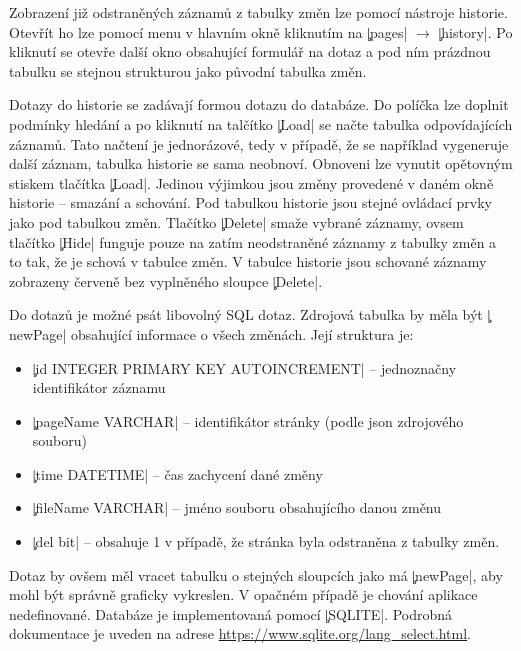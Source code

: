Zobrazení již odstraněných záznamů z tabulky změn lze pomocí nástroje historie.
Otevřít ho lze pomocí menu v hlavním okně kliknutím na \c|pages| $\rightarrow$ \c|history|.
Po kliknutí se otevře další okno obsahující formulář na dotaz a pod ním prázdnou tabulku se stejnou strukturou jako původní tabulka změn.

Dotazy do historie se zadávají formou dotazu do databáze. 
Do políčka lze doplnit podmínky hledání a po kliknutí na talčítko \c|Load| se načte tabulka odpovídajících záznamů. 
Tato načtení je jednorázové, tedy v případě, že se například vygeneruje další záznam, tabulka historie se sama neobnoví.
Obnoveni lze vynutit opětovným stiskem tlačítka \c|Load|.
Jedinou výjimkou jsou změny provedené v daném okně historie -- smazání a schování.
Pod tabulkou historie jsou stejné ovládací prvky jako pod tabulkou změn.
Tlačítko \c|Delete| smaže vybrané záznamy, ovsem tlačítko \c|Hide| funguje pouze na zatím neodstraněné záznamy z tabulky změn a to tak, že je schová  v tabulce změn.
V tabulce historie jsou schované záznamy zobrazeny červeně bez vyplněného sloupce \c|Delete|.

Do dotazů je možné psát libovolný SQL dotaz.
Zdrojová tabulka by měla být \c|newPage| obsahující informace o všech změnách. Její struktura je:
\begin{itemize}
	\item \c|id INTEGER PRIMARY KEY AUTOINCREMENT| -- jednoznačny identifikátor záznamu
	\item \c|pageName VARCHAR| -- identifikátor stránky (podle json zdrojového souboru)
	\item \c|time DATETIME| -- čas zachycení dané změny
	\item \c|fileName VARCHAR| -- jméno souboru obsahujícího danou změnu
	\item \c|del bit| -- obsahuje 1 v případě, že stránka byla odstraněna z tabulky změn.
\end{itemize}
Dotaz by ovšem měl vracet tabulku o stejných sloupcích jako má \c|newPage|, aby mohl být správně graficky vykreslen.
V opačném případě je chování aplikace nedefinované.
Databáze je implementovaná pomocí \c|SQLITE|.
Podrobná dokumentace je uveden na adrese \url{https://www.sqlite.org/lang_select.html}.
